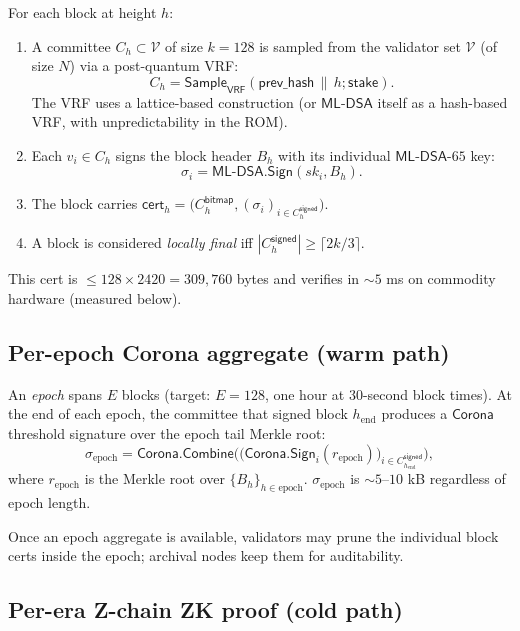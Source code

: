 \documentclass[11pt]{article}
\begin{document}
For each block at height $h$:
\begin{enumerate}
  \item A committee $C_h \subset \mathcal{V}$ of size $k = 128$ is sampled
        from the validator set $\mathcal{V}$ (of size $N$) via a
        post-quantum VRF:
        \[
          C_h = \textsf{Sample}_{\textsf{VRF}}\!\left(\textsf{prev\_hash} \,\|\, h; \textsf{stake}\right).
        \]
        The VRF uses a lattice-based construction (or $\mathsf{ML\text{-}DSA}$
        itself as a hash-based VRF, with unpredictability in the ROM).
  \item Each $v_i \in C_h$ signs the block header $B_h$ with its individual
        $\mathsf{ML\text{-}DSA}\text{-}65$ key:
        \[
          \sigma_i = \mathsf{ML\text{-}DSA.Sign}(sk_i, B_h).
        \]
  \item The block carries $\textsf{cert}_h = \big(C_h^{\textsf{bitmap}}, (\sigma_i)_{i \in C_h^{\textsf{signed}}}\big)$.
  \item A block is considered \emph{locally final} iff
        $|C_h^{\textsf{signed}}| \geq \lceil 2k/3 \rceil$.
\end{enumerate}

This cert is $\leq 128 \times 2420 = 309{,}760$ bytes and verifies in
$\sim 5$ ms on commodity hardware (measured below).

\subsection{Per-epoch Corona aggregate (warm path)}

An \emph{epoch} spans $E$ blocks (target: $E = 128$, one hour at 30-second
block times). At the end of each epoch, the committee that signed block
$h_{\text{end}}$ produces a $\mathsf{Corona}$ threshold signature over
the epoch tail Merkle root:
\[
  \sigma_{\text{epoch}} = \mathsf{Corona.Combine}\!\Big(\big(\mathsf{Corona.Sign}_i(r_{\text{epoch}})\big)_{i \in C_{h_{\text{end}}}^{\textsf{signed}}}\Big),
\]
where $r_{\text{epoch}}$ is the Merkle root over $\{B_h\}_{h \in \text{epoch}}$.
$\sigma_{\text{epoch}}$ is $\sim 5$--$10$ kB regardless of epoch length.

Once an epoch aggregate is available, validators may prune the individual
block certs inside the epoch; archival nodes keep them for auditability.

\subsection{Per-era Z-chain ZK proof (cold path)}
\end{document}
